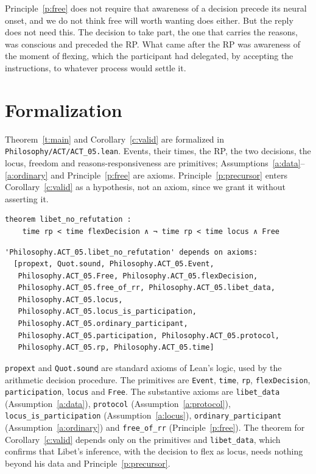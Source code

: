 \documentclass{situationist-preprint}
\begin{document}
\begin{reply}
Principle~\ref{p:free} does not require that awareness of a decision precede its neural onset, and we do not think free will worth wanting does either. But the reply does not need this. The decision to take part, the one that carries the reasons, was conscious and preceded the RP. What came after the RP was awareness of the moment of flexing, which the participant had delegated, by accepting the instructions, to whatever process would settle it.
\end{reply}

\section{Formalization}

Theorem~\ref{t:main} and Corollary~\ref{c:valid} are formalized in \nolinkurl{Philosophy/ACT/ACT_05.lean}. Events, their times, the RP, the two decisions, the locus, freedom and reasons-responsiveness are primitives; Assumptions~\ref{a:data}--\ref{a:ordinary} and Principle~\ref{p:free} are axioms. Principle~\ref{p:precursor} enters Corollary~\ref{c:valid} as a hypothesis, not an axiom, since we grant it without asserting it.

\begin{lstlisting}
theorem libet_no_refutation :
    time rp < time flexDecision ∧ ¬ time rp < time locus ∧ Free
\end{lstlisting}

\begin{lstlisting}
'Philosophy.ACT_05.libet_no_refutation' depends on axioms:
  [propext, Quot.sound, Philosophy.ACT_05.Event,
   Philosophy.ACT_05.Free, Philosophy.ACT_05.flexDecision,
   Philosophy.ACT_05.free_of_rr, Philosophy.ACT_05.libet_data,
   Philosophy.ACT_05.locus,
   Philosophy.ACT_05.locus_is_participation,
   Philosophy.ACT_05.ordinary_participant,
   Philosophy.ACT_05.participation, Philosophy.ACT_05.protocol,
   Philosophy.ACT_05.rp, Philosophy.ACT_05.time]
\end{lstlisting}

\texttt{propext} and \texttt{Quot.sound} are standard axioms of Lean's logic, used by the arithmetic decision procedure. The primitives are \texttt{Event}, \texttt{time}, \texttt{rp}, \texttt{flexDecision}, \texttt{participation}, \texttt{locus} and \texttt{Free}. The substantive axioms are \texttt{libet\_data} (Assumption~\ref{a:data}), \texttt{protocol} (Assumption~\ref{a:protocol}), \texttt{locus\_is\_participation} (Assumption~\ref{a:locus}), \texttt{ordinary\_participant} (Assumption~\ref{a:ordinary}) and \texttt{free\_of\_rr} (Principle~\ref{p:free}). The theorem for Corollary~\ref{c:valid} depends only on the primitives and \texttt{libet\_data}, which confirms that Libet's inference, with the decision to flex as locus, needs nothing beyond his data and Principle~\ref{p:precursor}.
\end{document}
